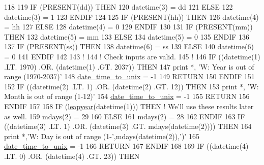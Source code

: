 \begin{DoxyCode}
118 
119 \textcolor{keywordflow}{IF} (\textcolor{keyword}{PRESENT}(dd)) \textcolor{keywordflow}{THEN}
120     datetime(3) = dd
121 \textcolor{keywordflow}{ELSE}
122     datetime(3) = 1
123 \textcolor{keywordflow}{ENDIF}
124 
125 \textcolor{keywordflow}{IF} (\textcolor{keyword}{PRESENT}(hh)) \textcolor{keywordflow}{THEN}
126     datetime(4) = hh
127 \textcolor{keywordflow}{ELSE}
128     datetime(4) = 0
129 \textcolor{keywordflow}{ENDIF}
130 
131 \textcolor{keywordflow}{IF} (\textcolor{keyword}{PRESENT}(mm)) \textcolor{keywordflow}{THEN}
132     datetime(5) = mm
133 \textcolor{keywordflow}{ELSE}
134     datetime(5) = 0
135 \textcolor{keywordflow}{ENDIF}
136 
137 \textcolor{keywordflow}{IF} (\textcolor{keyword}{PRESENT}(ss)) \textcolor{keywordflow}{THEN}
138     datetime(6) = ss
139 \textcolor{keywordflow}{ELSE}
140     datetime(6) = 0
141 \textcolor{keywordflow}{ENDIF}
142 
143 \textcolor{comment}{!}
144 \textcolor{comment}{! Check inputs are valid.}
145 \textcolor{comment}{!}
146 \textcolor{keywordflow}{IF} ((datetime(1) .LT. 1970) .OR. (datetime(1) .GT. 2037)) \textcolor{keywordflow}{THEN}
147     print *, \textcolor{stringliteral}{'W: Year is out of range (1970-2037)'}
148     \hyperlink{namespacetime_a7c66adfc707644b0644b33e1557f1486}{date\_time\_to\_unix}   = -1
149     \textcolor{keywordflow}{RETURN}
150 \textcolor{keywordflow}{ENDIF}
151 
152 \textcolor{keywordflow}{IF} ((datetime(2) .LT. 1) .OR. (datetime(2) .GT. 12)) \textcolor{keywordflow}{THEN}
153     print *, \textcolor{stringliteral}{'W: Month is out of range (1-12)'}
154     \hyperlink{namespacetime_a7c66adfc707644b0644b33e1557f1486}{date\_time\_to\_unix}   = -1
155     \textcolor{keywordflow}{RETURN}
156 \textcolor{keywordflow}{ENDIF}
157 
158 \textcolor{keywordflow}{IF} (\hyperlink{namespacetime_ac7f82d40fd2b49e7e9025b103e88555c}{leapyear}(datetime(1))) \textcolor{keywordflow}{THEN}     \textcolor{comment}{! We'll use these results later as well.}
159     mdays(2)    = 29
160 \textcolor{keywordflow}{ELSE}
161     mdays(2)    = 28
162 \textcolor{keywordflow}{ENDIF}
163 \textcolor{keywordflow}{IF} ((datetime(3) .LT. 1) .OR. (datetime(3) .GT. mdays(datetime(2)))) \textcolor{keywordflow}{THEN}
164     print *,\textcolor{stringliteral}{'W: Day is out of range (1-'},mdays(datetime(2)),\textcolor{stringliteral}{')'}
165     \hyperlink{namespacetime_a7c66adfc707644b0644b33e1557f1486}{date\_time\_to\_unix}   = -1
166     \textcolor{keywordflow}{RETURN}
167 \textcolor{keywordflow}{ENDIF}
168 
169 \textcolor{keywordflow}{IF} ((datetime(4) .LT. 0) .OR. (datetime(4) .GT. 23)) \textcolor{keywordflow}{THEN}

\end{DoxyCode}
